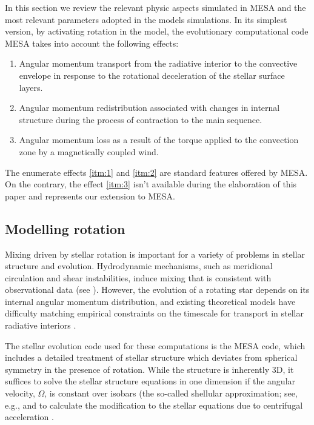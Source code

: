 \documentclass[fleqn,usenatbib]{mnras}
\begin{document}
In this section we review the relevant physic aspects simulated in MESA and the most relevant parameters adopted in the models simulations. In its simplest version, by activating rotation in the model, the evolutionary computational code MESA takes into account the following effects:
\begin{enumerate}
    \item Angular momentum transport from the radiative interior to the convective envelope in response to the rotational deceleration of the stellar surface layers\label{itm:1}.
    \item Angular momentum redistribution associated with changes in internal structure during the process of contraction to the main sequence\label{itm:2}.
    \item Angular momentum loss as a result of the torque applied to the convection zone by a magnetically coupled wind\label{itm:3}.
\end{enumerate}

The enumerate effects \ref{itm:1} and \ref{itm:2} are standard features offered by MESA. On the contrary, the effect \ref{itm:3} isn't available during the elaboration of this paper and represents our extension to MESA.

\subsection{Modelling rotation}

Mixing driven by stellar rotation is important for a variety of problems in stellar structure and evolution. Hydrodynamic mechanisms, such as meridional circulation and shear instabilities, induce mixing that is consistent with observational data (see \citet{Pinsonneault1997} \citet{Maeder2000}). However, the evolution of a rotating star depends on its internal angular momentum distribution, and existing theoretical models have difficulty matching empirical constraints on the timescale for transport in stellar radiative interiors \citep{Denissenkov2007}. \par

The stellar evolution code used for these computations is the MESA code, which includes a detailed treatment of stellar structure which deviates from spherical symmetry in the presence of rotation. While the structure is inherently 3D, it suffices to solve the stellar structure equations in one dimension if the angular velocity, $\Omega$, is constant over isobars (the so-called shellular approximation; see, e.g., \citet{Meynet1997} and to calculate the modification to the stellar equations due to centrifugal acceleration \citep{Endal1976}.
\end{document}

